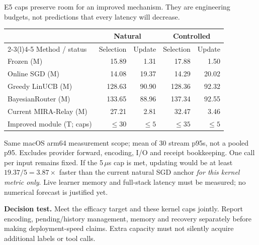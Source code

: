 \documentclass[10pt,letterpaper]{article}
\newcommand{\T}[1]{{\color{GuideBlue}#1}}
\newcommand{\note}[1]{{\fontsize{8.5}{10.5}\selectfont #1\par}}
\newcommand{\sectionhead}[1]{\vspace{7pt}{\large\bfseries #1}\par\vspace{3pt}}
\newenvironment{clean}{\begin{center}\fontsize{9.5}{11.5}\selectfont\setlength{\tabcolsep}{8pt}\renewcommand{\arraystretch}{1.10}}{\end{center}}
\begin{document}
\newpage
\sectionhead{4. Retain efficiency while adding useful capacity}
E5 caps preserve room for an improved mechanism. They are engineering budgets, not predictions that every latency will decrease.
\par\noindent\begin{minipage}{\linewidth}\end{minipage}\par
\begin{clean}
\begin{tabular}{@{}lrrrr@{}}
\toprule
& \multicolumn{2}{c}{Natural} & \multicolumn{2}{c}{Controlled} \\
\cmidrule(lr){2-3}\cmidrule(l){4-5}
Method / status & Selection & Update & Selection & Update \\
\midrule
Frozen (M) & 15.89 & 1.31 & 17.88 & 1.50 \\
Online SGD (M) & 14.08 & 19.37 & 14.29 & 20.02 \\
Greedy LinUCB (M) & 128.63 & 90.90 & 128.36 & 92.32 \\
BayesianRouter (M) & 133.65 & 88.96 & 137.34 & 92.55 \\
Current MIRA-Relay (M) & 27.21 & 2.81 & 32.47 & 3.46 \\
\midrule
\T{Improved module (T; caps)} & \T{$\leq30$} & \T{$\leq5$} & \T{$\leq35$} & \T{$\leq5$} \\

\bottomrule
\end{tabular}
\end{clean}
\note{Same macOS arm64 measurement scope; mean of 30 stream p95s, not a pooled p95. Excludes provider forward, encoding, I/O and receipt bookkeeping. One call per input remains fixed. If the 5\,$\mu$s cap is met, updating would be at least $19.37/5=3.87\times$ faster than the current natural SGD anchor \emph{for this kernel metric only}. Live learner memory and full-stack latency must be measured; no numerical forecast is justified yet.}
\textbf{Decision test.} Meet the efficacy target and these kernel caps jointly. Report encoding, pending/history management, memory and recovery separately before making deployment-speed claims. Extra capacity must not silently acquire additional labels or tool calls.
\end{document}
